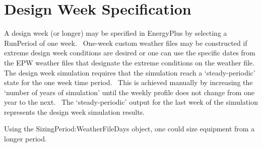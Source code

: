 \section{Design Week Specification}\label{design-week-specification}

A design week (or longer) may be specified in EnergyPlus by selecting a RunPeriod of one week.~ One-week custom weather files may be constructed if extreme design week conditions are desired or one can use the specific dates from the EPW weather files that designate the extreme conditions on the weather file.~ The design week simulation requires that the simulation reach a `steady-periodic' state for the one week time period.~ This is achieved manually by increasing the `number of years of simulation' until the weekly profile does not change from one year to the next.~ The `steady-periodic' output for the last week of the simulation represents the design week simulation results.

Using the SizingPeriod:WeatherFileDays object, one could size equipment from a longer period.
